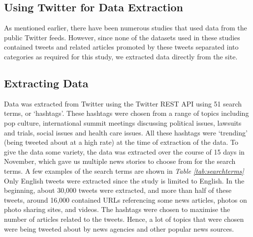 \documentclass[11pt]{article}
\newcommand{\tabref}[1]{\textit{Table \ref{#1}}}
\begin{document}
\subsection{Using Twitter for Data Extraction}

As mentioned earlier, there have been numerous studies that used data from the public Twitter feeds. However, since none of the datasets used in these studies contained tweets and related articles promoted by these tweets separated into categories as required for this study, we extracted data directly from the site.

\subsection{Extracting Data}

Data was extracted from Twitter using the Twitter REST API using 51 search terms, or ‘hashtags’. These hashtags were chosen from a range of topics including pop culture,  international summit meetings discussing political issues, lawsuits and trials, social issues and health care issues. All these hashtags were ‘trending’ (being tweeted about at a high rate) at the time of extraction of the data. To give the data some variety, the data was extracted over the course of 15 days in November, which gave us multiple news stories to choose from for the search terms. A few examples of the search terms are shown in \tabref{tab:searchterms} Only English tweets were extracted since the study is limited to English. In the beginning, about 30,000 tweets were extracted, and more than half of these tweets, around 16,000 contained URLs referencing some news articles, photos on photo sharing sites, and videos. The hashtags were chosen to maximise the number of articles related to the tweets. Hence, a lot of topics that were chosen were being tweeted about by news agencies and other popular news sources. 
\end{document}
